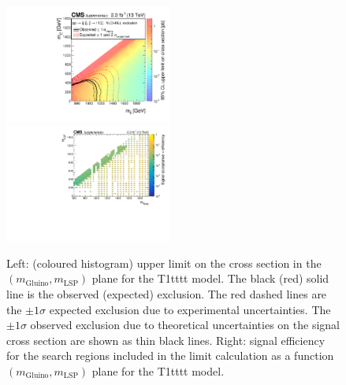 \begin{figure}[t]
  \begin{center}
    \includegraphics[width=0.49\textwidth]{RA1T1ttttXSEC_aux} \, 
    \includegraphics[width=0.49\textwidth]{T1tttt_merging_4_cats_aux} \,     
  \end{center}
  \caption{Left: (coloured histogram) upper limit on the cross section in the $(m_{\mathrm{Gluino}},m_{\mathrm{LSP}})$ plane for the T1tttt model. 
  The black (red) solid line is the observed (expected) exclusion. The red dashed lines are the $\pm1\sigma$ expected exclusion due to experimental uncertainties. 
  The $\pm1\sigma$ observed exclusion due to theoretical uncertainties on the signal cross section are shown as thin black lines. 
  Right: signal efficiency for the search regions included in the limit calculation as a function $(m_{\mathrm{Gluino}},m_{\mathrm{LSP}})$ plane for the T1tttt model. 
  \label{fig:T1tttt_excl}}
\end{figure}

